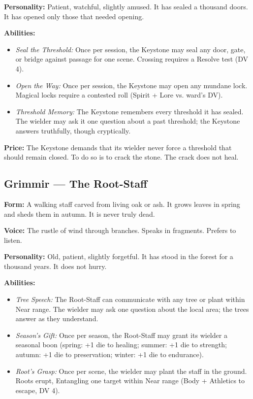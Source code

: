 \noindent\textbf{Personality:} Patient, watchful, slightly amused. It has sealed a thousand doors. It has opened only those that needed opening.

\noindent\textbf{Abilities:}
\begin{itemize}
\item \textit{Seal the Threshold:} Once per session, the Keystone may seal any door, gate, or bridge against passage for one scene. Crossing requires a Resolve test (DV 4).
\item \textit{Open the Way:} Once per session, the Keystone may open any mundane lock. Magical locks require a contested roll (Spirit + Lore vs. ward's DV).
\item \textit{Threshold Memory:} The Keystone remembers every threshold it has sealed. The wielder may ask it one question about a past threshold; the Keystone answers truthfully, though cryptically.
\end{itemize}

\noindent\textbf{Price:} The Keystone demands that its wielder never force a threshold that should remain closed. To do so is to crack the stone. The crack does not heal.

\subsection{Grimmir — The Root-Staff}

\noindent\textbf{Form:} A walking staff carved from living oak or ash. It grows leaves in spring and sheds them in autumn. It is never truly dead.

\noindent\textbf{Voice:} The rustle of wind through branches. Speaks in fragments. Prefers to listen.

\noindent\textbf{Personality:} Old, patient, slightly forgetful. It has stood in the forest for a thousand years. It does not hurry.

\noindent\textbf{Abilities:}
\begin{itemize}
\item \textit{Tree Speech:} The Root-Staff can communicate with any tree or plant within Near range. The wielder may ask one question about the local area; the trees answer as they understand.
\item \textit{Season's Gift:} Once per season, the Root-Staff may grant its wielder a seasonal boon (spring: +1 die to healing; summer: +1 die to strength; autumn: +1 die to preservation; winter: +1 die to endurance).
\item \textit{Root's Grasp:} Once per scene, the wielder may plant the staff in the ground. Roots erupt, Entangling one target within Near range (Body + Athletics to escape, DV 4).
\end{itemize}

